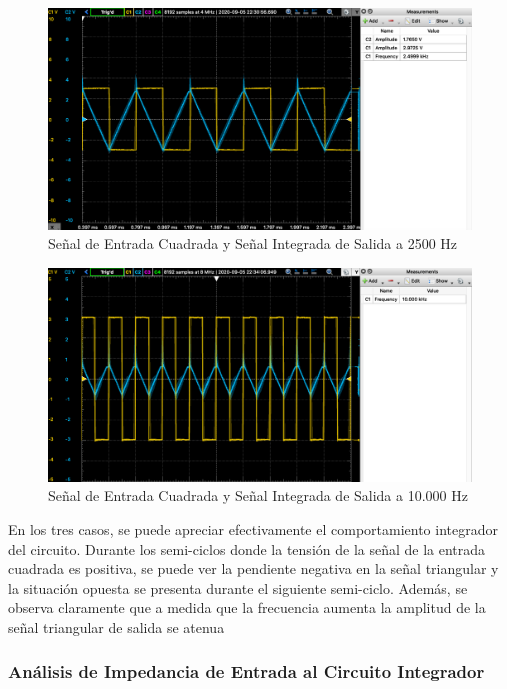 \begin{figure}[H]
    \centering 
    \includegraphics [scale=0.45] {../Ejercicio3-CircuitoIntegradoresyDerivadores/Imagenes/cuadrada-2500.png} 
    \caption{Señal de Entrada Cuadrada y Señal Integrada de Salida a 2500 Hz}
    \label{fig:emptyPlotTool}
\end{figure}

\begin{figure}[H]
    \centering 
    \includegraphics [scale=0.45] {../Ejercicio3-CircuitoIntegradoresyDerivadores/Imagenes/cuadrada-10000.png} 
    \caption{Señal de Entrada Cuadrada y Señal Integrada de Salida a 10.000 Hz}
    \label{fig:emptyPlotTool}
\end{figure}

En los tres casos, se puede apreciar efectivamente el comportamiento integrador del circuito. Durante los semi-ciclos donde la tensión de la señal 
de la entrada cuadrada es positiva, se puede ver la pendiente negativa en la señal triangular y la situación opuesta se presenta durante el siguiente semi-ciclo.
Además, se observa claramente que a medida que la frecuencia aumenta la amplitud de la señal triangular de salida se atenua

\subsubsection{Análisis de Impedancia de Entrada al Circuito Integrador}

